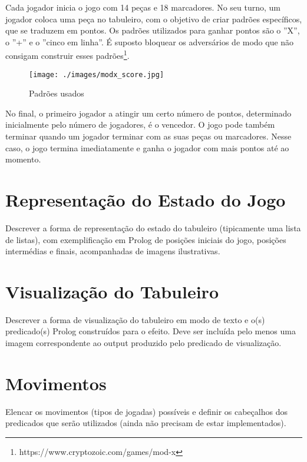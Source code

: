 \documentclass[a4paper]{article}
\begin{document}
Cada jogador inicia o jogo com 14 peças e 18 marcadores. 
No seu turno, um jogador coloca uma peça no tabuleiro, com o objetivo de criar padrões específicos, que se traduzem em pontos.
Os padrões utilizados para ganhar pontos são o ''X'', o ''+'' e o ''cinco em linha''.
É suposto bloquear os adversários de modo que não consigam construir esses padrões\footnote{https://www.cryptozoic.com/games/mod-x}.

\vspace{0.5cm}

\begin{figure}[h!]
	\begin{center}
		\texttt{[image: ./images/modx\_score.jpg]}
		\caption{Padrões usados}
		\label{fig:2}
	\end{center}
\end{figure}

\vspace{0.5cm}

No final, o primeiro jogador a atingir um certo número de pontos, determinado inicialmente pelo número de jogadores, é o vencedor.
O jogo pode também terminar quando um jogador terminar com as suas peças ou marcadores.
Nesse caso, o jogo termina imediatamente e ganha o jogador com mais pontos até ao momento.


\section{Representação do Estado do Jogo}

Descrever a forma de representação do estado do tabuleiro (tipicamente uma lista de listas), com exemplificação em Prolog de posições iniciais do jogo, posições intermédias e finais, acompanhadas de imagens ilustrativas.


\section{Visualização do Tabuleiro}

Descrever a forma de visualização do tabuleiro em modo de texto e o(s) predicado(s) Prolog construídos para o efeito.
Deve ser incluída pelo menos uma imagem correspondente ao output produzido pelo predicado de visualização.


\section{Movimentos}

Elencar os movimentos (tipos de jogadas) possíveis e definir os cabeçalhos dos predicados que serão utilizados (ainda não precisam de estar implementados).
\end{document}
